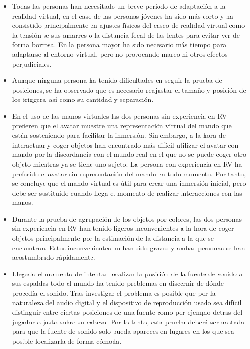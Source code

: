 \begin{itemize}
\item{Todas las personas han necesitado un breve periodo de adaptación a la realidad virtual, en el caso de las personas jóvenes ha sido más corto y ha consistido principalmente en ajustes físicos del casco de realidad virtual como la tensión se sus amarres o la distancia focal de las lentes para evitar ver de forma borrosa. En la persona mayor ha sido necesario más tiempo para adaptarse al entorno virtual, pero no provocando mareo ni otros efectos perjudiciales.}
\item{Aunque ninguna persona ha tenido dificultades en seguir la prueba de posiciones, se ha observado que es necesario reajustar el tamaño y posición de los triggers, así como su cantidad y separación.}
\item{En el uso de las manos virtuales las dos personas sin experiencia en RV prefieren que el avatar muestre una representación virtual del mando que están sosteniendo para facilitar la inmersión. Sin embargo, a la hora de interactuar y coger objetos han encontrado más difícil utilizar el avatar con mando por la discordancia con el mundo real en el que no se puede coger otro objeto mientras ya se tiene uno sujeto. La persona con experiencia en RV ha preferido el avatar sin representación del mando en todo momento. Por tanto, se concluye que el mando virtual es útil para crear una inmersión inicial, pero debe ser sustituido cuando llega el momento de realizar interacciones con las manos.}
\item{Durante la prueba de agrupación de los objetos por colores, las dos personas sin experiencia en RV han tenido ligeros inconvenientes a la hora de coger objetos principalmente por la estimación de la distancia a la que se encuentran. Estos inconvenientes no han sido graves y ambas personas se han acostumbrado rápidamente.}
\item{Llegado el momento de intentar localizar la posición de la fuente de sonido a sus espaldas todo el mundo ha tenido problemas en discernir de dónde procedía el sonido. Tras investigar el problema es posible que por la naturaleza del audio digital y el dispositivo de reproducción usado sea difícil distinguir entre ciertas posiciones de una fuente como por ejemplo detrás del jugador o justo sobre su cabeza. Por lo tanto, esta prueba deberá ser acotada para que la fuente de sonido solo pueda apareces en lugares en los que sea posible localizarla de forma cómoda.}

\end{itemize}


